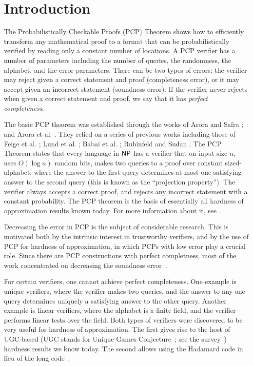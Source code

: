 \chapter{Introduction}
\noindent The Probabilistically Checkable Proofs (PCP) Theorem shows
how to efficiently transform any mathematical proof to a format that
can be probabilistically verified by reading only a constant number of
locations. A PCP verifier has a number of parameters including the
number of queries, the randomness, the alphabet, and the error
parameters. There can be two types of errors: the verifier may reject
given a correct statement and proof (completeness error), or it may
accept given an incorrect statement (soundness error).  If the
verifier never rejects when given a correct statement and proof, we
say that it has {\em perfect completeness}.

The basic PCP theorem was established through the works of Arora and
Safra \cite{AS}; and Arora et al. \cite{ALMSS}. They relied on a series of previous works including those of
Feige et al. \cite{FGLSS}; Lund et al. \cite{LFKN}; Babai et
al. \cite{BFL,BFLS}; Rubinfeld and Sudan \cite{RuSu}. The PCP Theorem
states that every language in ${\sf {\sf NP}}$ has a verifier that on input
size $n$, uses $O(\log n)$ random bits, makes two queries to a proof
over constant sized-alphabet; where the answer to the first query
determines at most one satisfying answer to the second query (this is
known as the ``projection property''). The verifier always accepts a
correct proof, and rejects any incorrect statement with a constant
probability.  The PCP theorem is the basis of essentially all hardness
of approximation results known today. For more information about it,
see \cite{D}.

Decreasing the error in PCP is the subject of considerable
research. This is motivated both by the intrinsic interest in
trustworthy verifiers, and by the use of PCP for hardness of
approximation, in which PCPs with low error play a crucial role.
Since there are PCP constructions with perfect completness, most of
the work concentrated on decreasing the soundness
error~\cite{Raz,RaSa,ArSu,DFKRS,MR08,IKW,DM10}.

For certain verifiers, one cannot achieve perfect completeness.  One
example is unique verifiers, where the verifier makes two queries, and
the answer to any one query determines uniquely a satisfying answer to
the other query. Another example is linear verifiers, where the
alphabet is a finite field, and the verifier performs linear tests
over the field.  Both types of verifiers were discovered to be very
useful for hardness of approximation.  The first gives rise to the
host of UGC-based (UGC stands for Unique Games Conjecture~\cite{Khot};
see the survey~\cite{K-Survey}) hardness results we know today. The
second allows using the Hadamard code in lieu of the long
code~\cite{Khot01}.

